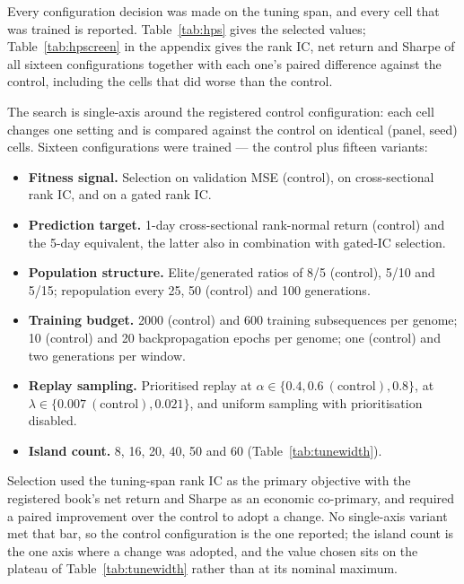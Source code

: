 Every configuration decision was made on the tuning span, and every cell
that was trained is reported. Table~\ref{tab:hps} gives the selected
values; Table~\ref{tab:hpscreen} in the appendix gives the rank IC, net
return and Sharpe of all sixteen configurations together with each one's
paired difference against the control, including the cells that did
worse than the control.

The search is single-axis around the registered control configuration:
each cell changes one setting and is compared against the control on
identical (panel, seed) cells. Sixteen configurations were trained ---
the control plus fifteen variants:

\begin{itemize}\itemsep2pt
\item \textbf{Fitness signal.} Selection on validation MSE (control),
      on cross-sectional rank IC, and on a gated rank IC.
\item \textbf{Prediction target.} 1-day cross-sectional rank-normal
      return (control) and the 5-day equivalent, the latter also in
      combination with gated-IC selection.
\item \textbf{Population structure.} Elite/generated ratios of 8/5
      (control), 5/10 and 5/15; repopulation every 25, 50 (control) and
      100 generations.
\item \textbf{Training budget.} 2000 (control) and 600 training
      subsequences per genome; 10 (control) and 20 backpropagation
      epochs per genome; one (control) and two generations per window.
\item \textbf{Replay sampling.} Prioritised replay at
      $\alpha \in \{0.4, 0.6\ (\text{control}), 0.8\}$, at
      $\lambda \in \{0.007\ (\text{control}), 0.021\}$, and uniform
      sampling with prioritisation disabled.
\item \textbf{Island count.} 8, 16, 20, 40, 50 and 60
      (Table~\ref{tab:tunewidth}).
\end{itemize}

Selection used the tuning-span rank IC as the primary objective with the
registered book's net return and Sharpe as an economic co-primary, and
required a paired improvement over the control to adopt a change. No
single-axis variant met that bar, so the control configuration is the one
reported; the island count is the one axis where a change was adopted,
and the value chosen sits on the plateau of Table~\ref{tab:tunewidth}
rather than at its nominal maximum.

